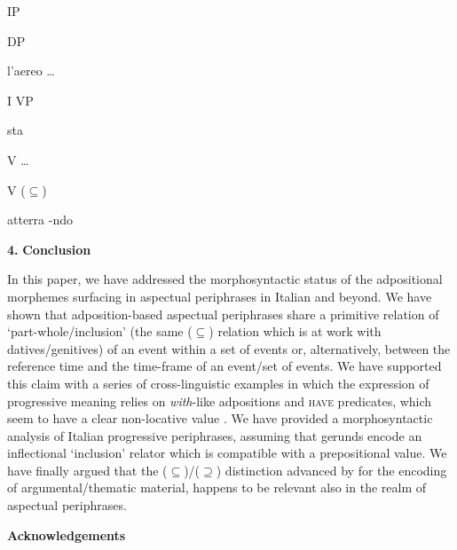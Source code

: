 \documentclass[output=paper,colorlinks,citecolor=brown]{./langscibook}
\begin{document}
                                                IP

                               

                            DP 

                          l’aereo                                    …

                                             I                          VP

                                           sta

                                                          V                          …

                                                   

                                              V                      (${\subseteq}$)

                                           atterra                {}-ndo   

\textbf{4.} \textbf{Conclusion} 

In this paper, we have addressed the morphosyntactic status of the adpositional morphemes surfacing in aspectual periphrases in Italian and beyond. We have shown that adposition-based aspectual periphrases share a primitive relation of ‘part-whole/inclusion’ (the same (${\subseteq}$) relation which is at work with datives/genitives) of an event within a set of events or, alternatively, between the reference time and the time-frame of an event/set of events. We have supported this claim with a series of cross-linguistic examples in which the expression of progressive meaning relies on \textit{with}{}-like adpositions and \textsc{have} predicates, which seem to have a clear non-locative value \citep{Levinson2011}. We have provided a morphosyntactic analysis of Italian progressive periphrases, assuming that gerunds encode an inflectional ‘inclusion’ relator which is compatible with  a prepositional value. We have finally argued that the (${\subseteq}$)/(${\supseteq}$) distinction advanced by \citet{FrancoManzini2017b} for the encoding of argumental/thematic material, happens to be relevant also in the realm of aspectual periphrases.

\textbf{Acknowledgements}
\end{document}
